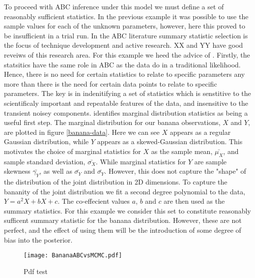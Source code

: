 To proceed with ABC inference under this model we must define a set of reasonably sufficient statistics. In the previous example it was possible to use the sample values for each of the unknown parameters, however, here this proved to be insufficient in a trial run. In the ABC literature summary statistic selection is the focus of technique development and active research. XX and YY have good reveiws of this research area. For this example we heed the advice of \citet{Wood2010}. Firstly, the statsitics have the same role in ABC as the data do in a traditional likelihood. Hence, there is no need for certain statistics to relate to specific parameters any more than there is the need for certain data points to relate to specific parameters. The key is in indenitifying a set of statistics which is senstitive to the scientificaly important and repeatable features of the data, and insensitive to the transient noisey components. \citet{Wood2010} identifies marginal distribution statistics as being a useful first step. The marginal distribution for our banana observations, $X$ and $Y$, are plotted in figure \ref{banana-data}. Here we can see $X$ appears as a regular Gaussian distribution, while $Y$ appears as a skewed-Gaussian distribution. This motivates the choice of marginal statistics for $X$ as the sample mean, $\bar{\mu_X}$, and sample standard deviation, $\bar{\sigma_X}$. While marginal statistics for $Y$ are sample skewness $\bar{\gamma_Y}$, as well as $\bar{\sigma_Y}$ and $\bar{\sigma_Y}$. However, this does not capture the "shape" of the distribution of the joint distribution in 2D dimensions. To capture the bananity of the joint distribution we fit a second degree polynomial to the data, $Y = a^2X + bX + c$. The co-effecient values $a$, $b$ and $c$ are then used as the summary statistics. For this example we consider this set to constitute reasonably sufficent summary statistic for the banana distribution. However, these are not perfect, and the effect of using them will be the introduction of some degree of bias into the posterior. \\

\begin{figure}[H]
\centering
\texttt{[image: BananaABCvsMCMC.pdf]}
\caption{Pdf test}
\end{figure}
